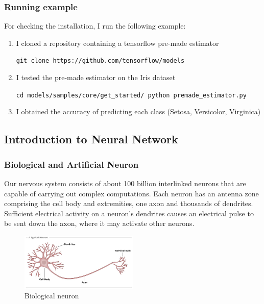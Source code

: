 \documentclass[a4paper,10pt]{article}
\begin{document}
		\subsubsection{Running example}
			For checking the installation, I run the following example:
		 \begin{enumerate}
		\item I cloned a repository containing a tensorflow pre-made estimator
		
		\texttt{git clone https://github.com/tensorflow/models}
		\vspace{5mm} %
		
		\item I tested the pre-made estimator on the Iris dataset
		
		\texttt{cd models/samples/core/get\_started/ python premade\_estimator.py}
		\vspace{5mm} %
		
		\item I obtained the accuracy of predicting each class (Setosa, Versicolor, Virginica) 
		 \end{enumerate}
	
 \subsection{Introduction to Neural Network}
 
  \subsubsection{Biological and Artificial Neuron}
  \quad Our nervous system consists of about 100 billion interlinked neurons that are capable of carrying out complex computations. Each neuron has an antenna zone comprising the cell body and extremities, one axon and thousands of dendrites. Sufficient electrical activity on a neuron’s dendrites causes an electrical pulse to be sent down the axon, where it may activate other neurons.  
   \begin{figure}[!htbp]
   	\centering
   	\includegraphics[width=0.5\textwidth]{neuron.jpg}
   	\caption{Biological neuron}
   \end{figure}
\end{document}
